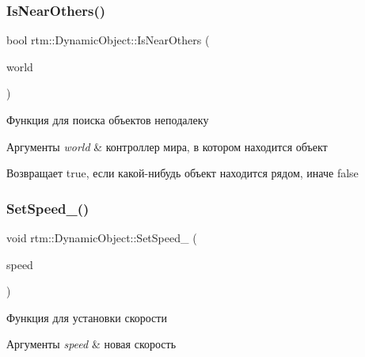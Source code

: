 \mbox{\label{classrtm_1_1_dynamic_object_adcbb0baaad8ba2185e00221cc90fdee9}} 
\subsubsection{\texorpdfstring{Is\+Near\+Others()}{IsNearOthers()}}
{\footnotesize\ttfamily bool rtm\+::\+Dynamic\+Object\+::\+Is\+Near\+Others (\begin{DoxyParamCaption}\item[{\hyperlink{classrtm_1_1_world_controller}{World\+Controller} $\ast$const}]{world }\end{DoxyParamCaption})}

Функция для поиска объектов неподалеку 
\begin{DoxyParams}{Аргументы}
{\em world} & контроллер мира, в котором находится объект \\
\hline
\end{DoxyParams}
\begin{DoxyReturn}{Возвращает}
true, если какой-\/нибудь объект находится рядом, иначе false 
\end{DoxyReturn}
\mbox{\label{classrtm_1_1_dynamic_object_aceb38c6ff9d41d814953d4538e32542f}} 
\subsubsection{\texorpdfstring{Set\+Speed\+\_\+()}{SetSpeed\_()}}
{\footnotesize\ttfamily void rtm\+::\+Dynamic\+Object\+::\+Set\+Speed\+\_\+ (\begin{DoxyParamCaption}\item[{float}]{speed }\end{DoxyParamCaption})\hspace{0.3cm}{\ttfamily [protected]}}

Функция для установки скорости 
\begin{DoxyParams}{Аргументы}
{\em speed} & новая скорость \\
\hline
\end{DoxyParams}
\mbox{\label{classrtm_1_1_dynamic_object_a50d64daac674d1e9f55ce1fb73cf9d6a}} 
